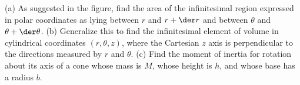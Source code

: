 (a) As suggested in the figure, find the area of the infinitesimal region
expressed in polar coordinates as lying between $r$ and $r+\der r$ and
between $\theta$ and $\theta+\der\theta$.\answercheck\hwendpart
(b) Generalize this to find the infinitesimal element of volume in cylindrical coordinates $(r,\theta,z)$, where the
Cartesian $z$ axis is perpendicular to the directions measured by $r$ and $\theta$.\answercheck\hwendpart
(c) Find the moment of inertia for rotation about its axis
of a cone whose mass is $M$, whose height is $h$, and whose base
has a radius $b$.\answercheck
